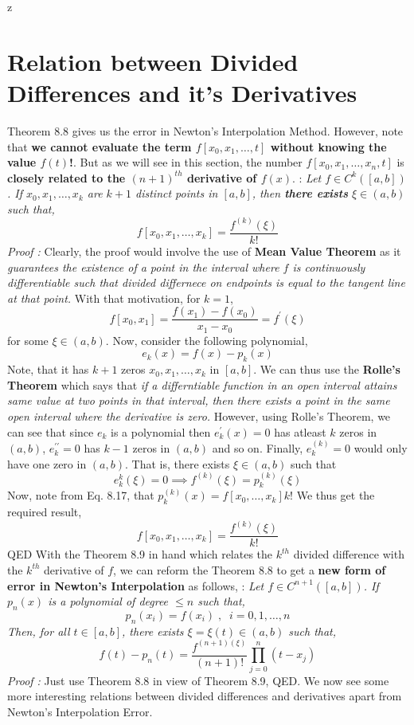 z\documentclass[a4paper,12pt,twoside]{book}
\newcommand{\nll}[0]{\newline\newline}
\newcommand{\tit}[1]{\textit{#1}}
\newcommand{\theor}[1]{\boxed{\textbf{\textit{Theorem \thechapter.#1}}}}
\begin{document}
\section{Relation between Divided Differences and it's Derivatives}
Theorem 8.8 gives us the error in Newton's Interpolation Method. However, note that \textbf{we cannot evaluate the term $f[x_0,x_1,\dots,t]$ without knowing the value $f(t)$!}.
\nll
But as we will see in this section, the number $f[x_0,x_1,\dots,x_n,t]$ is \textbf{closely related to the $(n+1)^{th}$ derivative of $f(x)$}.
\nll
\theor{9} : \tit{Let $f \in C^k([a,b])$. If $x_0, x_1, \dots, x_k$ are $k+1$ distinct points in $[a,b]$, then \textbf{there exists} $\xi \in (a,b)$ such that,
\begin{equation}
    f[x_0,x_1,\dots,x_k] = \frac{f^{(k)}(\xi)}{k!}
\end{equation}
}
\newline
\tit{Proof :} Clearly, the proof would involve the use of \textbf{Mean Value Theorem} as it \tit{guarantees the existence of a point in the interval where $f$ is continuously differentiable such that divided differnece on endpoints is equal to the tangent line at that point. }
\nll
With that motivation, for $k=1$,
\[f[x_0,x_1] = \frac{f(x_1) - f(x_0)}{x_1 - x_0} = f^\prime (\xi)\]
for some $\xi \in (a,b)$. 
\nll
Now, consider the following polynomial,
\[ e_k(x) = f(x) - p_k(x) \]
Note, that it has $k+1$ zeros $x_0,x_1,\dots,x_k$ in $[a,b]$. We can thus use the \textbf{Rolle's Theorem} which says that \tit{if a differntiable function in an open interval attains same value at two points in that interval, then there exists a point in the same open interval where the derivative is zero.}
\nll
However, using Rolle's Theorem, we can see that since $e_k$ is a polynomial then $e_k^\prime(x) = 0 $ has atleast $k$ zeros in $(a,b)$, $e_k^{\prime\prime} = 0 $ has $k-1$ zeros in $(a,b)$ and so on. Finally, $e^{(k)}_k = 0$ would only have one zero in $(a,b)$. That is, there exists $\xi \in (a,b)$ such that 
\[e^{k}_k(\xi) = 0 \implies f^{(k)}(\xi) = p_k^{(k)}(\xi) \]
Now, note from Eq. 8.17, that $p_k^{(k)}(x) = f[x_0,\dots,x_k] k!$
We thus get the required result,
\[f[x_0,x_1,\dots,x_k] = \frac{f^{(k)}(\xi)}{k!} \]
QED
\nll
With the Theorem 8.9 in hand which relates the $k^{th}$ divided difference with the $k^{th}$ derivative of $f$, we can reform the Theorem 8.8 to get a \textbf{new form of error in Newton's Interpolation} as follows,
\nll
\theor{10} : \tit{Let $f\in C^{n+1}([a,b])$. If $p_n(x)$ is a polynomial of degree $\le n$ such that,
\[ p_n(x_i) = f(x_i)\;,\;\; i =0,1,\dots,n\]
Then, for all $t \in [a,b]$, there exists $\xi = \xi(t) \in (a,b)$ such that,
\begin{equation}
  \boxed{  f(t) - p_n(t) = \frac{f^{(n+1)(\xi)}}{(n+1)!} \prod_{j=0}^{n}(t-x_j)}
\end{equation}
}
\newline
\tit{Proof : } Just use Theorem 8.8 in view of Theorem 8.9, QED. 
\nll
We now see some more interesting relations between divided differences and derivatives apart from Newton's Interpolation Error.
\end{document}
